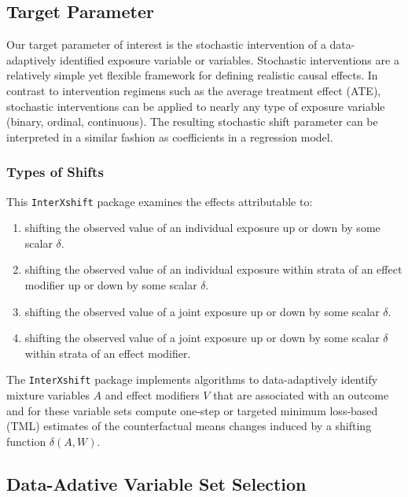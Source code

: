 \documentclass[
]{article}
\providecommand{\tightlist}{%
  \setlength{\itemsep}{0pt}\setlength{\parskip}{0pt}}
\begin{document}
\hypertarget{target-parameter}{%
\subsection{Target Parameter}\label{target-parameter}}

Our target parameter of interest is the stochastic intervention of a
data-adaptively identified exposure variable or variables. Stochastic
interventions are a relatively simple yet flexible framework for
defining realistic causal effects. In contrast to intervention regimens
such as the average treatment effect (ATE), stochastic interventions can
be applied to nearly any type of exposure variable (binary, ordinal,
continuous). The resulting stochastic shift parameter can be interpreted
in a similar fashion as coefficients in a regression model.

\hypertarget{types-of-shifts}{%
\subsubsection{Types of Shifts}\label{types-of-shifts}}

This \texttt{InterXshift} package examines the effects attributable to:

\begin{enumerate}
\def\labelenumi{\arabic{enumi}.}
\tightlist
\item
  shifting the observed value of an individual exposure up or down by
  some scalar \(\delta\).
\item
  shifting the observed value of an individual exposure within strata of
  an effect modifier up or down by some scalar \(\delta\).
\item
  shifting the observed value of a joint exposure up or down by some
  scalar \(\delta\).
\item
  shifting the observed value of a joint exposure up or down by some
  scalar \(\delta\) within strata of an effect modifier.
\end{enumerate}

The \texttt{InterXshift} package implements algorithms to data-adaptively
identify mixture variables \(A\) and effect modifiers \(V\) that are
associated with an outcome and for these variable sets compute one-step
or targeted minimum loss-based (TML) estimates of the counterfactual
means changes induced by a shifting function \(\delta(A,W)\).

\hypertarget{data-adative-variable-set-selection}{%
\subsection{Data-Adative Variable Set
Selection}\label{data-adative-variable-set-selection}}
\end{document}
